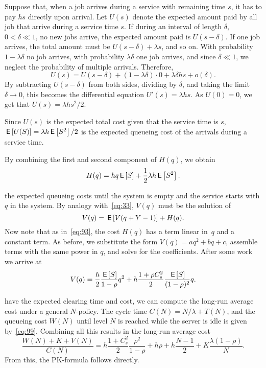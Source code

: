 Suppose that, when a job arrives during a service with remaining time $s$, it has to pay $h s$ directly upon arrival.
Let $U(s)$ denote the expected amount paid by all job that arrive during a service time $s$.
If during an interval of length $\delta$, $0<\delta\ll 1$, no new jobs arrive, the expected amount paid is $U(s-\delta)$.
If one job arrives, the total amount must be $U(s-\delta) + \lambda s$, and so on.
With probability $1-\lambda \delta$ no job arrives, with probability $\lambda \delta$ one job arrives, and since $\delta\ll 1$, we neglect the probability of multiple arrivals.
Therefore,
\begin{equation*}
  U(s) = U(s-\delta) + (1-\lambda \delta)\cdot 0 + \lambda \delta h s + o(\delta).
\end{equation*}
By subtracting $U(s-\delta)$ from both sides, dividing by $\delta$, and taking the limit $\delta \to 0$, this becomes the differential equation $U'(s) = \lambda  h s$. As $U(0)=0$,  we get that $U(s)= \lambda h s^2/2$. 

Since $U(s)$ is the expected total cost given that the service time is $s$, $\,\mathsf{E}\left[U(S)\right] = \lambda h \,\mathsf{E}\left[S^2\right]/2$ is the expected queueing cost of the arrivals during a service time.

By combining the first and second component of $H(q)$, we obtain
\begin{equation*}
  H(q) = h q \,\mathsf{E}\left[S\right] + \frac 12 \lambda h \,\mathsf{E}\left[S^2\right].
\end{equation*}


 the expected queueing costs until the system is empty and the service starts with $q$ in the system.
By analogy with~\cref{eq:33}, $V(q)$ must be the solution of
\begin{equation}  \label{eq:98}
  V(q) = \,\mathsf{E}\left[V(q+Y-1)\right]+ H(q).
\end{equation}
Now note that as in~\cref{eq:93}, the cost $H(q)$ has a term linear in~$q$ and a constant term.
As before, we substitute the form $V(q) = aq^2 + bq+c$, assemble terms with the same power in $q$, and solve for the coefficients.
After some work we arrive at
\begin{align*}
  V(q) = \frac{h}{2}\frac{\,\mathsf{E}\left[S\right]}{1-\rho} q^2 + h  \frac{ 1+ \rho C_s^2}2 \frac{\,\mathsf{E}\left[S\right]}{(1-\rho)^2} q.
\end{align*}

 have the expected clearing time and cost, we can compute the long-run average cost under a general $N$-policy.
The cycle time $C(N) = N/\lambda + T(N)$, and the queueing cost $W(N)$ until level $N$ is reached while the server is idle is given by~\cref{eq:99}.
Combining all this results in the long-run average cost
\begin{equation}  \label{eq:100}
    \frac{W(N) + K + V(N)}{C(N)}
    = h \frac{1+ C_s^2}2 \frac{\rho^2}{1-\rho} + h \rho + h \frac{N-1}2 + K \frac{\lambda(1-\rho)}N.
\end{equation}
From this, the PK-formula follows directly.

